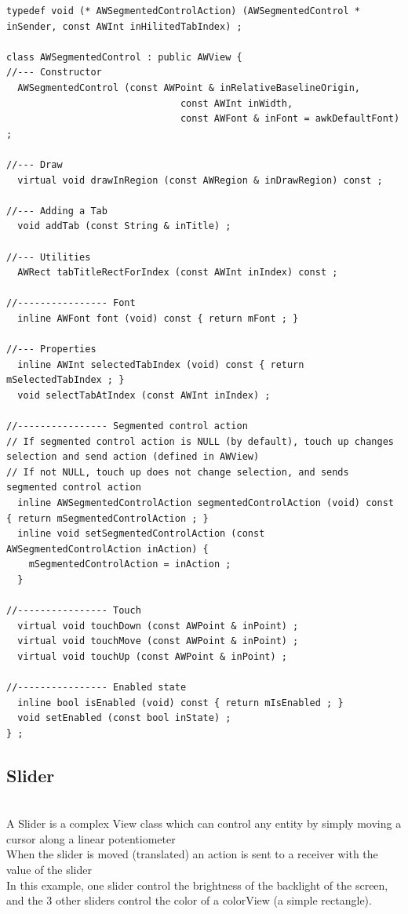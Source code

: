\documentclass[a4paper,11pt]{extarticle}
\begin{document}
\begin{lstlisting}[language=Arduinonl]
typedef void (* AWSegmentedControlAction) (AWSegmentedControl * inSender, const AWInt inHilitedTabIndex) ;

class AWSegmentedControl : public AWView {
//--- Constructor
  AWSegmentedControl (const AWPoint & inRelativeBaselineOrigin,
                               const AWInt inWidth,
                               const AWFont & inFont = awkDefaultFont) ;

//--- Draw
  virtual void drawInRegion (const AWRegion & inDrawRegion) const ;

//--- Adding a Tab
  void addTab (const String & inTitle) ;

//--- Utilities
  AWRect tabTitleRectForIndex (const AWInt inIndex) const ;

//---------------- Font
  inline AWFont font (void) const { return mFont ; }

//--- Properties
  inline AWInt selectedTabIndex (void) const { return mSelectedTabIndex ; }
  void selectTabAtIndex (const AWInt inIndex) ;

//---------------- Segmented control action
// If segmented control action is NULL (by default), touch up changes selection and send action (defined in AWView)
// If not NULL, touch up does not change selection, and sends segmented control action
  inline AWSegmentedControlAction segmentedControlAction (void) const { return mSegmentedControlAction ; }
  inline void setSegmentedControlAction (const AWSegmentedControlAction inAction) {
    mSegmentedControlAction = inAction ;
  }

//---------------- Touch
  virtual void touchDown (const AWPoint & inPoint) ;
  virtual void touchMove (const AWPoint & inPoint) ;
  virtual void touchUp (const AWPoint & inPoint) ;

//---------------- Enabled state
  inline bool isEnabled (void) const { return mIsEnabled ; }
  void setEnabled (const bool inState) ;
} ;
\end{lstlisting}


\newpage
\subsection{Slider}

~\\ A Slider is a complex View class which can control any entity by simply moving a cursor along a linear potentiometer
~\\ When the slider is moved (translated) an action is sent to a receiver with the value of the slider 
~\\ In this example, one slider control the brightness of the backlight of the screen, and the 3 other sliders control the color of a colorView (a simple rectangle).
\end{document}
